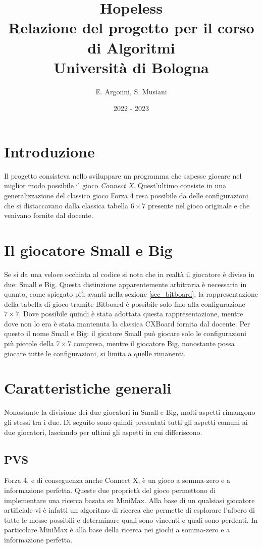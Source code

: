 \documentclass[a4paper]{article}
\title{\textbf{Hopeless}\\
\vspace{0.2cm}\normalsize Relazione del progetto per il corso di Algoritmi\\
\normalsize Università di Bologna}
\author{
  E. Argonni,
  S. Musiani
}
\date{2022 - 2023}
\begin{document}
\maketitle

\section{Introduzione}

Il progetto consisteva nello sviluppare un programma che sapesse giocare nel 
miglior modo possibile il gioco \emph{Connect X}. Quest'ultimo consiste in una
generalizzazione del classico gioco Forza 4 resa possibile da delle 
configurazioni che si distaccavano dalla classica tabella $6 \times 7$ presente 
nel gioco originale e che venivano fornite dal docente.

\section{Il giocatore Small e Big}

Se si da una veloce occhiata al codice si nota che in realtà il giocatore è 
diviso in due: Small e Big. Questa distinzione apparentemente arbitraria è 
necessaria in quanto, come spiegato più avanti nella sezione \ref{sec_bitboard},
la rappresentazione della tabella di gioco tramite Bitboard è possibile solo 
fino alla configurazione $7 \times 7$. Dove possibile quindi è stata adottata 
questa rappresentazione, mentre dove non lo era è stata mantenuta la classica
CXBoard fornita dal docente. Per questo il nome Small e Big: il gicatore Small 
può giocare solo le configurazioni più piccole della $7 \times 7$ compresa, 
mentre il giocatore Big, nonostante possa giocare tutte le configurazioni, si 
limita a quelle rimanenti.

\section{Caratteristiche generali}

Nonostante la divisione dei due giocatori in Small e Big, molti aspetti 
rimangono gli stessi tra i due. Di seguito sono quindi presentati tutti gli 
aspetti comuni ai due giocatori, lasciando per ultimi gli aspetti in cui 
differiscono.

\subsection{PVS}
Forza 4, e di conseguenza anche Connect X, è un gioco a somma-zero e a
informazione perfetta. Queste due proprietà del gioco permettono di implementare
una ricerca basata su MiniMax. Alla base di un qualsiasi giocatore artificiale
vi è infatti un algoritmo di ricerca che permette di esplorare l'albero di tutte
le mosse possibili e determinare quali sono vincenti e quali sono perdenti. In
particolare MiniMax è alla base della ricerca nei giochi a somma-zero e a
informazione perfetta.
\end{document}
